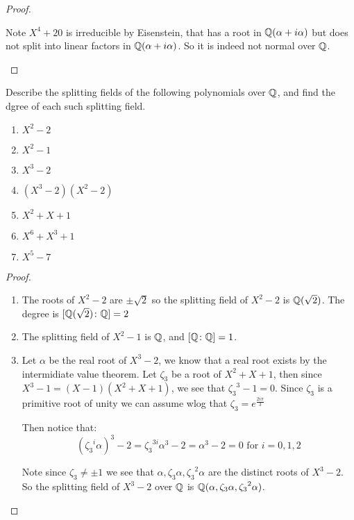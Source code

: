 \begin{exercise}
\begin{proof}
\begin{enumerate}[label = (\alph*)]
    Note $X^4+20$ is irreducible by Eisenstein, that has a root in $\mathbb{Q}(\alpha+i\alpha)$ but does not split into linear factors in $\mathbb{Q}(\alpha+i\alpha)$. So it is indeed not normal over $\mathbb{Q}$.
\end{enumerate}
\end{proof}
\end{exercise}
\begin{exercise}
    Describe the splitting fields of the following polynomials over $\mathbb{Q}$, and find the dgree of each such splitting field.

    \begin{enumerate}[label= (\alph*)]
        \item $X^2-2$
        \item $X^2-1$
        \item $X^3-2$
        \item $(X^3-2)(X^2-2)$
        \item $X^2+X+1$
        \item $X^6+X^3+1$
        \item $X^5-7$
    \end{enumerate}
\begin{proof}
    \begin{enumerate}[label=(\alph*)]
        \item The roots of $X^2-2$ are $\pm\sqrt{2}$ so the splitting field of $X^2-2$ is $\mathbb{Q}(\sqrt{2})$. The degree is  $[\mathbb{Q}(\sqrt{2})\colon \mathbb{Q}] = 2$
        \item The splitting field of $X^2-1$ is $\mathbb{Q}$, and $[\mathbb{Q}\colon \mathbb{Q}] = 1$.
        \item Let $\alpha$ be the real root of $X^3 - 2$, we know that a real root exists by the intermidiate value theorem.
        Let $\zeta_3$ be a root of $X^2+X+1$, then since $X^3-1 = (X-1)(X^2+X+1)$, we see that ${\zeta_3}^3 - 1=0$. Since $\zeta_3$ is a primitive root of unity we can assume wlog that $\zeta_3 = e^{\frac{2i\pi}{3}}$ 
        
        Then notice that:\begin{equation}
            {({\zeta_3}^i\alpha)}^3 - 2 = {\zeta_3}^{3i}\alpha^3 - 2 = \alpha^3 - 2 = 0 \text{ for }i=0,1,2
        \end{equation}

        Note since $\zeta_3\neq \pm 1$ we see that $\alpha, \zeta_3 \alpha, {\zeta_3}^2 \alpha$ are the distinct roots of $X^3-2$. So the splitting field of $X^3 - 2$ over $\mathbb{Q}$ is $\mathbb{Q}(\alpha, \zeta_3\alpha, {\zeta_3}^2\alpha)$.



\end{enumerate}
\end{proof}
\end{exercise}
